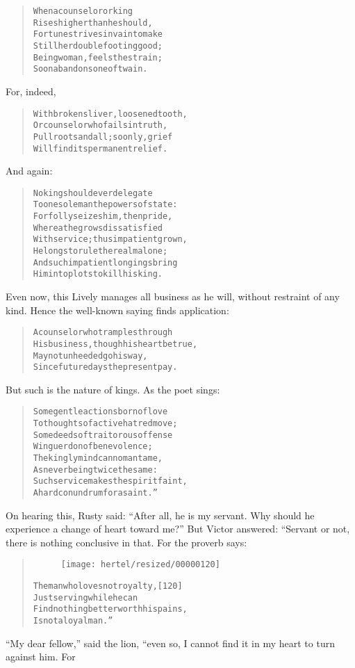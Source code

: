 \documentclass[article, twoside, 10pt]{memoir}
\renewenvironment{verbatim}{%
\begin{quote}%
\vskip -10pt%
\begin{alltt}\normalfont\small}{\end{alltt}%
\end{quote}%
\vskip -10pt
} %
\begin{document}
\begin{verbatim}
When a counselor or king
    Rises higher than he should,
Fortune strives in vain to make
    Still her double footing good;
Being woman, feels the strain;
Soon abandons one of twain.
\end{verbatim}
For, indeed,

\begin{verbatim}
With broken sliver, loosened tooth,
Or counselor who fails in truth,
Pull roots and all; so only, grief
Will find its permanent relief.
\end{verbatim}
And again:

\begin{verbatim}
No king should ever delegate
To one sole man the powers of state:
For folly seizes him, then pride,
Whereat he grows dissatisfied
With service; thus impatient grown,
He longs to rule the realm alone;
And such impatient longings bring
Him into plots to kill his king.
\end{verbatim}
Even now, this Lively manages all business as he will, without
restraint of any kind. Hence the well-known saying finds
application:

\begin{verbatim}
A counselor who tramples through
His business, though his heart be true,
May not unheeded go his way,
Since future days the present pay.
\end{verbatim}
But such is the nature of kings. As the poet sings:

\begin{verbatim}
Some gentle actions born of love
To thoughts of active hatred move;
Some deeds of traitorous offense
Win guerdon of benevolence;
The kingly mind can no man tame,
As never being twice the same:
Such service makes the spirit faint,
A hard conundrum for a saint.”
\end{verbatim}
On hearing this, Rusty said:
``After all, he is my servant. Why should he experience a change of heart toward me?''
But Victor answered: “Servant or not, there is nothing conclusive
in that. For the proverb says:

\begin{verbatim}
\begin{figure}[p]\texttt{[image: hertel/resized/00000120]}\end{figure}The man who loves not royalty,                          [120]
    Just serving while he can
Find nothing better worth his pains,
    Is not a loyal man.”
\end{verbatim}
``My dear fellow,'' said the lion, “even so, I cannot find it in my
heart to turn against him. For
\end{document}

